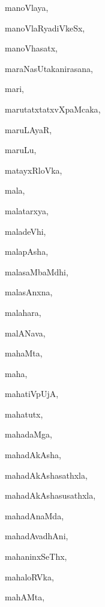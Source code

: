 \begin{multicols}{3}
{\noindent
{manoVlaya}, \pageref{manoVlaya}

\noindent
{manoVlaRyadiVkeSx}, \pageref{manoVlaRyadiVkeSx}

\noindent
{manoVhasatx}, \pageref{manoVhasatx}

\noindent
{maraNasUtakanirasana}, \pageref{maraNasUtakanirasana}

\noindent
{mari}, \pageref{mari}

\noindent
{marutatxtatxvXpaMcaka}, \pageref{marutatxtatxvXpaMcaka}

\noindent
{maruLAyaR}, \pageref{maruLAyaR}

\noindent
{maruLu}, \pageref{maruLu}

\noindent
{matayxRloVka}, \pageref{matayxRloVka}

\noindent
{mala}, \pageref{mala}

\noindent
{malatarxya}, \pageref{malatarxya}

\noindent
{maladeVhi}, \pageref{maladeVhi}

\noindent
{malapAsha}, \pageref{malapAsha}

\noindent
{malasaMbaMdhi}, \pageref{malasaMbaMdhi}

\noindent
{malasAnxna}, \pageref{malasAnxna}

\noindent
{malahara}, \pageref{malahara}

\noindent
{malANava}, \pageref{malANava}

\noindent
{mahaMta}, \pageref{mahaMta}

\noindent
{maha}, \pageref{maha}

\noindent
{mahatiVpUjA}, \pageref{mahatiVpUjA}

\noindent
{mahatutx}, \pageref{mahatutx}

\noindent
{mahadaMga}, \pageref{mahadaMga}

\noindent
{mahadAkAsha}, \pageref{mahadAkAsha}

\noindent
{mahadAkAshasathxla}, \pageref{mahadAkAshasathxla}

\noindent
{mahadAkAshasusathxla}, \pageref{mahadAkAshasusathxla}

\noindent
{mahadAnaMda}, \pageref{mahadAnaMda}

\noindent
{mahadAvadhAni}, \pageref{mahadAvadhAni}

\noindent
{mahaninxSeThx}, \pageref{mahaninxSeThx}

\noindent
{mahaloRVka}, \pageref{mahaloRVka}

\noindent
{mahAMta}, \pageref{mahAMta}

}
\end{multicols}
